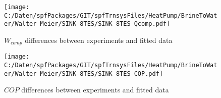 \documentclass[english]{SPFShortReport}
\begin{document}
\begin{figure}[!ht]
\begin{center}
\texttt{[image: C:/Daten/spfPackages/GIT/spfTrnsysFiles/HeatPump/BrineToWater/Walter Meier/SINK-8TES/SINK-8TES-Qcomp.pdf]}
\caption{$W_{comp}$ differences between experiments and fitted data}
\label{QcompFig}
\end{center}
\end{figure}
\begin{figure}[!ht]
\begin{center}
\texttt{[image: C:/Daten/spfPackages/GIT/spfTrnsysFiles/HeatPump/BrineToWater/Walter Meier/SINK-8TES/SINK-8TES-COP.pdf]}
\caption{$COP$ differences between experiments and fitted data}
\label{COPFig}
\end{center}
\end{figure}
\end{document}
